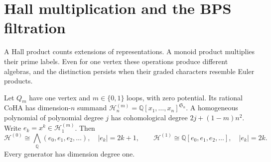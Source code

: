 \section{Hall multiplication and the BPS filtration}
\label{v4-arith:ks:CoHA-conjectural}

A Hall product counts extensions of representations. A monoid product
multiplies their prime labels. Even for one vertex these operations
produce different algebras, and the distinction persists when their
graded characters resemble Euler products.

\begin{proposition}
\label{v4-arith:ks:one-vertex-coha}
\ClaimStatusProvedHere{}
Let $Q_m$ have one vertex and $m\in\{0,1\}$ loops, with zero potential.
Its rational CoHA has dimension-$n$ summand
$\mathcal H^{(m)}_n=\mathbb Q[x_1,\ldots,x_n]^{\mathfrak S_n}$.
A homogeneous polynomial of polynomial degree $j$ has cohomological
degree $2j+(1-m)n^2$. Write $e_k=x^k\in\mathcal H^{(m)}_1$.
Then
\[
 \mathcal H^{(0)}\cong\bigwedge_{\mathbb Q}(e_0,e_1,e_2,\ldots),
 \quad |e_k|=2k+1,
 \qquad
 \mathcal H^{(1)}\cong\mathbb Q[e_0,e_1,e_2,\ldots],
 \quad |e_k|=2k.
\]
Every generator has dimension degree one.
\end{proposition}

